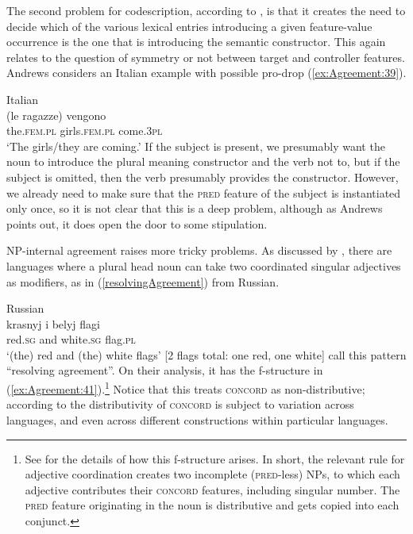 \documentclass[output=paper,hidelinks]{langscibook}
\begin{document}
The second problem for codescription, according to
\citet{andrews2008}, is that it creates the need to decide which of
the various lexical entries introducing a given feature-value
occurrence is the one that is introducing the semantic
constructor. This again relates to the question of symmetry or not
between target and controller features. Andrews considers an Italian example with possible pro-drop (\ref{ex:Agreement:39}).

\ea\label{ex:Agreement:39} Italian\\
\gll(le ragazze) vengono\\
\phantom{(}the.\textsc{fem.pl} girls.\textsc{fem.pl} come.\textsc{3pl}\\
\glt`The girls/they are coming.'
\z
If the subject is present, we presumably want the noun to introduce
the plural meaning constructor and the verb not to, but if the subject
is omitted, then the verb presumably provides the
constructor. However, we already need to make sure that the
\textsc{pred} feature of the subject is instantiated only once, so it
is not clear that this is a deep problem, although as Andrews points
out, it does open the door to some stipulation.

NP-internal agreement raises more tricky problems. As discussed by
\citet{belyaev-etal2015}, there are languages where a plural head noun can
take two coordinated singular adjectives as modifiers, as in (\ref{resolvingAgreement})
from Russian.

\ea\label{resolvingAgreement}Russian\\
\gll 
krasnyj i belyj flagi\\
red.\textsc{sg} and white.\textsc{sg} flag.\textsc{pl} \\
\glt`(the) red and (the) white flags' [2 flags total: one red, one white]
\z
\citet{belyaev-etal2015} call this pattern “resolving agreement”. On their
analysis, it has the f-structure in (\ref{ex:Agreement:41}).\footnote{See \citet{belyaev-etal2015} for the details of how this f-structure arises. In short, the relevant rule for adjective coordination creates two incomplete (\textsc{pred}-less) NPs, to which each adjective contributes their \textsc{concord} features, including singular number. The \textsc{pred} feature originating in the noun is distributive and gets copied into each conjunct.} Notice that this treats \textsc{concord} as non-distributive; according to \citet{belyaev-etal2015} the distributivity of \textsc{concord} is subject to variation across languages, and even across different constructions within particular languages.
\end{document}
